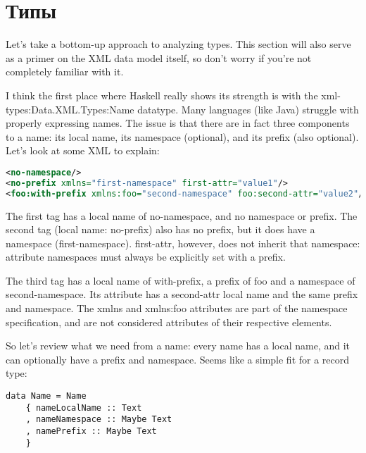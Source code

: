 \section{Типы} %

Let's take a bottom-up approach to analyzing types. This section will also serve as a primer on the XML data model itself, so don't worry if you're not completely familiar with it.

I think the first place where Haskell really shows its strength is with the xml-types:Data.XML.Types:Name datatype. Many languages (like Java) struggle with properly expressing names. The issue is that there are in fact three components to a name: its local name, its namespace (optional), and its prefix (also optional). Let's look at some XML to explain:

\begin{lstlisting}[language=XML]
<no-namespace/>
<no-prefix xmlns="first-namespace" first-attr="value1"/>
<foo:with-prefix xmlns:foo="second-namespace" foo:second-attr="value2"/>
\end{lstlisting}

The first tag has a local name of no-namespace, and no namespace or prefix. The second tag (local name: no-prefix) also has no prefix,  but it does have a namespace (first-namespace). first-attr, however, does not inherit that namespace: attribute namespaces must always be explicitly set with a prefix.


The third tag has a local name of with-prefix, a prefix of foo and a namespace of second-namespace. Its attribute has a second-attr local name and the same prefix and namespace. The xmlns and xmlns:foo attributes are part of the namespace
specification, and are not considered attributes of their respective elements.

So let's review what we need from a name: every name has a local name, and it can optionally have a prefix and namespace. Seems like a simple fit for a record type:

\begin{lstlisting}
data Name = Name
    { nameLocalName :: Text
    , nameNamespace :: Maybe Text
    , namePrefix :: Maybe Text
    }
\end{lstlisting}

